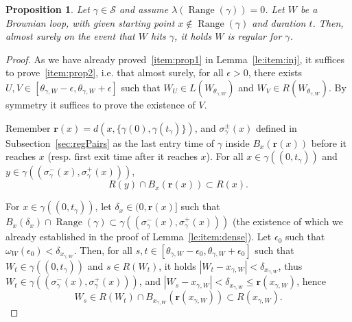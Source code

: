 \documentclass[11pt]{article}
\newtheorem{proposition}[theorem]{Proposition}
\DeclareMathOperator{\Range}{Range}
\def\rhos{\mathbf{r}}
\begin{document}
\begin{proposition}
    \label{prop:tech:casT}
    Let $\gamma\in \mathscr{S}$ and assume $\lambda(\Range(\gamma))=0$.
    Let $W$ be a Brownian loop, with given starting point $x\notin \Range(\gamma)$ and duration $t$. Then, almost surely on the event that $W$ hits $\gamma$, it holds $W$ is regular for $\gamma$.
\end{proposition}
\begin{proof}
    As we have already proved~\ref{item:prop1} in Lemma~\ref{le:item:inj}, it suffices to prove~\ref{item:prop2}, i.e. that almost surely, for all $\epsilon>0$, there exists $U,V\in [\theta_{\gamma,W}-\epsilon, \theta_{\gamma,W}+\epsilon]$ such that $W_U\in L(W_{\theta_{\gamma,W}})$ and $W_V\in R(W_{\theta_{\gamma,W}})$. By symmetry it suffices to prove the existence of $V$.

    Remember $\rhos(x)=d(x, \{ \gamma(0), \gamma(t_\gamma)\})$, and $\sigma^\pm_\gamma(x)$ defined in Subsection~\ref{sec:regPairs} as the last entry time of $\gamma$ inside $B_x(\rhos(x))$ before it reaches $x$ (resp. first exit time after it reaches $x$). For all $x\in \gamma((0,t_\gamma))$ and $y\in\gamma((\sigma^-_\gamma(x), \sigma^+_\gamma(x)))$,  \[R(y)\cap B_x(\rhos(x))\subset  R(x).\]

    For $x\in\gamma((0,t_\gamma))$, let $\delta_x\in (0,\rhos(x)]$ such that $B_x(\delta_x)\cap \Range(\gamma)\subset \gamma( (\sigma^-_\gamma(x), \sigma^+_\gamma(x))   )$ (the existence of which we already established in the proof of Lemma~\ref{le:item:dense}).
    Let $\epsilon_0$ such that $\omega_W (\epsilon_0)< \delta_{x_{\gamma,W}} $. Then, for all $s,t\in [\theta_{\gamma,W}-\epsilon_0,\theta_{\gamma,W}+\epsilon_0 ]$ such that $ W_t\in \gamma((0,t_\gamma))$ and $s\in R(W_t)$, it holds $|W_t-x_{\gamma,W}|< \delta_{x_{\gamma,W}} $, thus $W_t\in \gamma( (\sigma^-_\gamma(x), \sigma^+_\gamma(x))   )$, and $|W_s-x_{\gamma,W}|< \delta_{x_{\gamma,W}}\leq \rhos(x_{\gamma,W})$,
    hence
\begin{equation} \label{eq:temp:flipRpoint} W_s\in  R(W_t)\cap B_{x_{\gamma,W}}(\rhos(x_{\gamma,W}))\subset  R(x_{\gamma,W}).\end{equation}


\end{proof}
\end{document}
